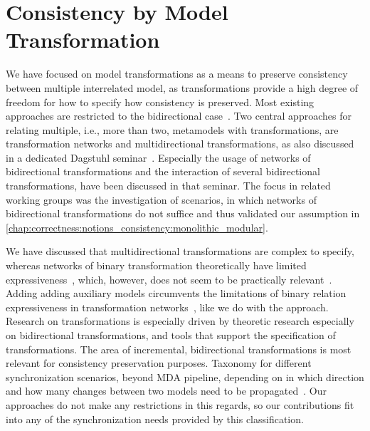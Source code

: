 \section{Consistency by Model Transformation}

We have focused on model transformations as a means to preserve consistency between multiple interrelated model, as transformations provide a high degree of freedom for how to specify how consistency is preserved.
Most existing approaches are restricted to the bidirectional case~\cite{weidmann2020ApplyingBidirectionalTransformations-WSRE, cleve2019dagstuhl}.
Two central approaches for relating multiple, i.e., more than two, metamodels with transformations, are transformation networks and multidirectional transformations, as also discussed in a dedicated Dagstuhl seminar~\cite{cleve2019dagstuhl}.
Especially the usage of networks of bidirectional transformations and the interaction of several bidirectional transformations, have been discussed in that seminar.
The focus in related working groups was the investigation of scenarios, in which networks of bidirectional transformations do not suffice and thus validated our assumption in \autoref{chap:correctness:notions_consistency:monolithic_modular}.

We have discussed that multidirectional transformations are complex to specify, whereas networks of binary transformation theoretically have limited expressiveness~\cite{stevens2020BidirectionalTransformationLarge-SoSym}, which, however, does not seem to be practically relevant~\cite{cleve2019dagstuhl}.
Adding adding auxiliary models circumvents the limitations of binary relation expressiveness in transformation networks~\cite{stevens2020BidirectionalTransformationLarge-SoSym}, like we do with the \commonalities approach.
Research on transformations is especially driven by theoretic research especially on bidirectional transformations, and tools that support the specification of transformations.
The area of incremental, bidirectional transformations is most relevant for consistency preservation purposes.
Taxonomy for different synchronization scenarios, beyond MDA pipeline, depending on in which direction and how many changes between two models need to be propagated~\cite{diskin2016Taxonomy-JSS}.
Our approaches do not make any restrictions in this regards, so our contributions fit into any of the synchronization needs provided by this classification.


